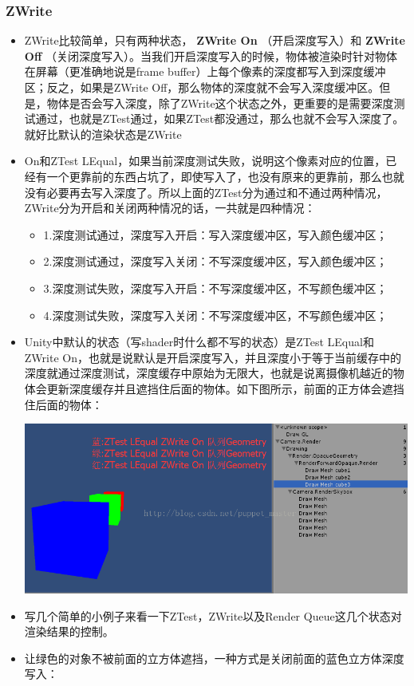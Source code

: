 \documentclass[9pt, b5paper]{article}
\begin{document}
\subsubsection{ZWrite}
\label{sec-2-6-2}
\begin{itemize}
\item ZWrite比较简单，只有两种状态， \textbf{ZWrite On} （开启深度写入）和 \textbf{ZWrite Off} （关闭深度写入）。当我们开启深度写入的时候，物体被渲染时针对物体在屏幕（更准确地说是frame buffer）上每个像素的深度都写入到深度缓冲区；反之，如果是ZWrite Off，那么物体的深度就不会写入深度缓冲区。但是，物体是否会写入深度，除了ZWrite这个状态之外，更重要的是需要深度测试通过，也就是ZTest通过，如果ZTest都没通过，那么也就不会写入深度了。就好比默认的渲染状态是ZWrite
\item On和ZTest LEqual，如果当前深度测试失败，说明这个像素对应的位置，已经有一个更靠前的东西占坑了，即使写入了，也没有原来的更靠前，那么也就没有必要再去写入深度了。所以上面的ZTest分为通过和不通过两种情况，ZWrite分为开启和关闭两种情况的话，一共就是四种情况：
\begin{itemize}
\item 1.深度测试通过，深度写入开启：写入深度缓冲区，写入颜色缓冲区；
\item 2.深度测试通过，深度写入关闭：不写深度缓冲区，写入颜色缓冲区；
\item 3.深度测试失败，深度写入开启：不写深度缓冲区，不写颜色缓冲区；
\item 4.深度测试失败，深度写入关闭：不写深度缓冲区，不写颜色缓冲区；
\end{itemize}
\item Unity中默认的状态（写shader时什么都不写的状态）是ZTest LEqual和ZWrite On，也就是说默认是开启深度写入，并且深度小于等于当前缓存中的深度就通过深度测试，深度缓存中原始为无限大，也就是说离摄像机越近的物体会更新深度缓存并且遮挡住后面的物体。如下图所示，前面的正方体会遮挡住后面的物体：

\includegraphics[width=.9\linewidth]{./pic/zwrite1.png}
\item 写几个简单的小例子来看一下ZTest，ZWrite以及Render Queue这几个状态对渲染结果的控制。
\item 让绿色的对象不被前面的立方体遮挡，一种方式是关闭前面的蓝色立方体深度写入：


\end{itemize}
\end{document}

